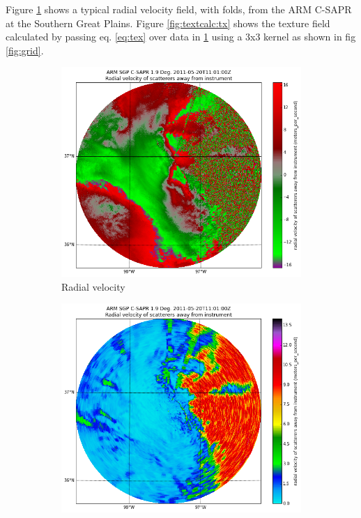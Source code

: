 \documentclass[twocol]{ametsoc}
\begin{document}
Figure \ref{fig:textcalc:vr} shows a typical radial velocity field, with folds, from the ARM C-SAPR at the Southern Great Plains. Figure \ref{fig:textcalc:tx} shows the texture field calculated by passing eq. \ref{eq:tex} over data in \ref{fig:textcalc:vr} using a 3x3 kernel as shown in fig \ref{fig:grid}. 

\begin{figure}[h]
    \centering
    \begin{subfigure}[b]{0.4\columnwidth}
        \includegraphics[width=\columnwidth]{radial_velocity.png}
        \caption{Radial velocity}
        \label{fig:textcalc:vr}
    \end{subfigure}
    \begin{subfigure}[b]{0.4\columnwidth}
        \includegraphics[width=\columnwidth]{texture.png}

\end{subfigure}
\end{figure}
\end{document}
